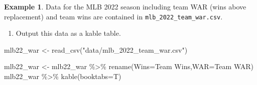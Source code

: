 \documentclass[
  11pt,
]{book}
\newenvironment{Shaded}{\begin{snugshade}}{\end{snugshade}}
\newcommand{\AttributeTok}[1]{\textcolor[rgb]{0.77,0.63,0.00}{#1}}
\newcommand{\FunctionTok}[1]{\textcolor[rgb]{0.00,0.00,0.00}{#1}}
\newcommand{\NormalTok}[1]{#1}
\newcommand{\OtherTok}[1]{\textcolor[rgb]{0.56,0.35,0.01}{#1}}
\newcommand{\SpecialCharTok}[1]{\textcolor[rgb]{0.00,0.00,0.00}{#1}}
\newcommand{\StringTok}[1]{\textcolor[rgb]{0.31,0.60,0.02}{#1}}
\providecommand{\tightlist}{%
  \setlength{\itemsep}{0pt}\setlength{\parskip}{0pt}}
\theoremstyle{definition}
\theoremstyle{definition}
\newtheorem{example}{Example}[chapter]
\theoremstyle{definition}
\theoremstyle{definition}
\theoremstyle{remark}
\begin{document}
\newpage

\begin{example}
Data for the MLB 2022 season including team WAR (wins above replacement) and team wins are contained in \texttt{mlb\_2022\_team\_war.csv}.
\end{example}

\begin{enumerate}
\def\labelenumi{(\alph{enumi})}
\tightlist
\item
  Output this data as a kable table.
\end{enumerate}

\begin{Shaded}
\begin{Highlighting}[]
\NormalTok{mlb22\_war }\OtherTok{\textless{}{-}} \FunctionTok{read\_csv}\NormalTok{(}\StringTok{"data/mlb\_2022\_team\_war.csv"}\NormalTok{)}

\NormalTok{mlb22\_war }\OtherTok{\textless{}{-}}\NormalTok{ mlb22\_war }\SpecialCharTok{\%\textgreater{}\%} \FunctionTok{rename}\NormalTok{(}\AttributeTok{Wins=}\StringTok{\textasciigrave{}}\AttributeTok{Team Wins}\StringTok{\textasciigrave{}}\NormalTok{,}\AttributeTok{WAR=}\StringTok{\textasciigrave{}}\AttributeTok{Team WAR}\StringTok{\textasciigrave{}}\NormalTok{)}
\NormalTok{mlb22\_war }\SpecialCharTok{\%\textgreater{}\%} \FunctionTok{kable}\NormalTok{(}\AttributeTok{booktabs=}\NormalTok{T)}
\end{Highlighting}
\end{Shaded}
\end{document}
